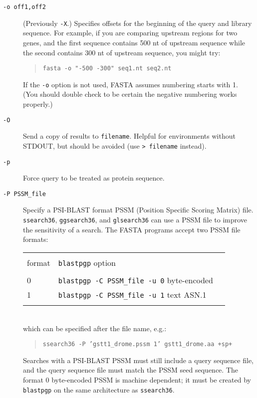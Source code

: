 \documentclass[11pt]{article}
\begin{document}
\begin{description}
\item[\texttt{-o off1,off2}]
(Previously \texttt{-X}.) Specifies offsets for the beginning of the query and library sequence.
For example, if you are comparing upstream regions for two genes, and
the first sequence contains 500 nt of upstream sequence while the
second contains 300 nt of upstream sequence, you might try:
\begin{quote}
\texttt{fasta -o "-500 -300" seq1.nt seq2.nt}
\end{quote}
If the \texttt{-o} option is not used, FASTA assumes numbering starts with 1.
(You should double check to be certain the negative numbering works
properly.)

\item[\texttt{-O}] Send a copy of results to \texttt{filename}.
  Helpful for environments without STDOUT, but should be avoided (use
  \texttt{> filename} instead).

\item[\texttt{-p}]
Force query to be treated as protein sequence.

\item[\texttt{-P PSSM\_file}]
Specify a PSI-BLAST format PSSM (Position Specific Scoring Matrix)
file.  \texttt{ssearch36}, \texttt{ggsearch36}, and
\texttt{glsearch36} can use a PSSM file to improve the sensitivity of
a search. The FASTA programs accept two PSSM file formats:\\[2ex]
\begin{tabular}{l l l}
\hline\\[-1.5ex]
format & \texttt{blastpgp} option \\[0.5ex]
\hline\\[-1.5ex]
0 & \texttt{blastpgp -C PSSM\_file -u 0} byte-encoded \\
1 & \texttt{blastpgp -C PSSM\_file -u 1} text ASN.1 \\
\hline\\[-0.5ex]
\end{tabular}\\
which can be specified after the file name, e.g.:
\begin{quote}
\texttt{ssearch36 -P 'gstt1\_drome.pssm 1' gstt1\_drome.aa +sp+}
\end{quote}
Searches with a PSI-BLAST PSSM must still include a query sequence
file, and the query sequence file must match the PSSM seed sequence.
The format 0 byte-encoded PSSM is machine dependent; it must be
created by \texttt{blastpgp} on the same architecture as
\texttt{ssearch36}.


\end{description}
\end{document}
